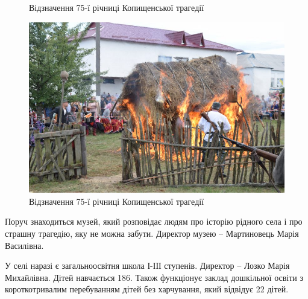 \begin{figure}
\begin{subfigure}[b]{0.3\textwidth}
		\caption{}
		\label{fig:mouse}
		\end{subfigure}
	\caption{Відзначення 75-ї річниці Копищенської трагедії}\label{fig:animals}
\end{figure}
\begin{figure}[h]
	
	\centering
	
	\includegraphics[width=0.8\linewidth]{1.jpg}
	
	\caption{Відзначення 75-ї річниці Копищенської трагедії}
	
	\label{fig:mpr}
	
\end{figure}
Поруч знаходиться музей, який розповідає людям про історію рідного села і про страшну трагедію, яку не можна забути. Директор музею – Мартиновець Марія Василівна.

У селі наразі є загальноосвітня школа І-ІІІ ступенів. Директор – Лозко Марія Михайлівна. Дітей навчається 186. Також функціонує заклад дошкільної освіти з короткотривалим перебуванням дітей без харчування, який відвідує 22 дітей.






